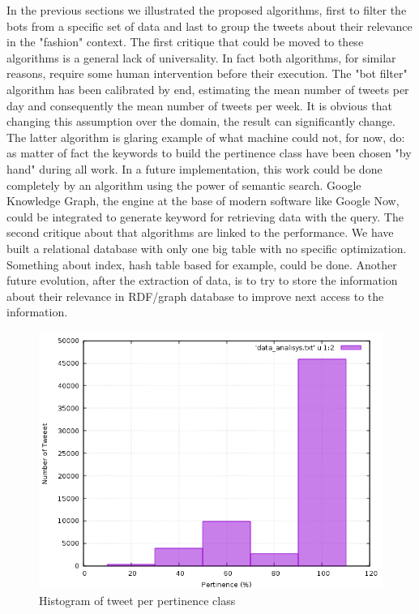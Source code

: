 \documentclass[conference, onecolumn]{IEEEtran}
\begin{document}
In the previous sections we illustrated the proposed algorithms, first to filter the bots from a specific set of data and last to group the tweets about their relevance in the "fashion" context. The first critique that could be moved to these algorithms is a general lack of universality. In fact both algorithms, for similar reasons, require some human intervention before their execution. The "bot filter" algorithm has been calibrated by end, estimating the mean number of tweets per day and consequently the mean number of tweets per week. It is obvious that changing this assumption over the domain, the result can significantly change. The latter algorithm is glaring example of what machine could not, for now, do: as matter of fact the keywords to build the pertinence class have been chosen "by hand" during all work. In a future implementation, this work could be done completely by an algorithm using the power of semantic search. Google Knowledge Graph, the engine at the base of modern software like Google Now, could be integrated to generate keyword for retrieving data with the query. The second critique about that algorithms are linked to the performance. We have built a relational database with only one big table with no specific optimization. Something about index, hash table based for example, could be done. Another future evolution, after the extraction of data, is to try to store the information about their relevance in RDF/graph database to improve next access to the information.
\begin{figure} [!htbp]
	\centering
	\vspace{0.3cm}
	\includegraphics[scale=0.6]{images/hystogram}
	\caption{Histogram of tweet per pertinence class}
	\vspace{0.3cm}
	\label{fig:histogram}
\end{figure}


\end{document}
